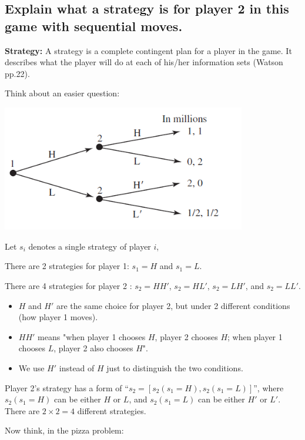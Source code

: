 \documentclass{article}
\begin{document}
%
%
\subsection{Explain what a strategy is for player 2 in this game with sequential moves.}
\label{subsec:stragey}

\begin{mdframed}[backgroundcolor=blue!20,linecolor=white]

\textbf{Strategy:} A strategy is a complete contingent plan for a player in the game.
It describes what the player will do at each of his/her information sets (Watson pp.22). 

\vspace{2mm}

Think about an easier question:

\begin{center}
{\includegraphics[width=0.8\textwidth]{7.f2_7}
\label{fig:f2_7}}
\vspace{2mm}
\end{center}

Let $s_i$ denotes a single strategy of player $i$,

There are 2 strategies for player 1: $s_1 =H$ and $s_1=L$. 

There are 4 strategies for player 2 : $s_2 =HH'$, $s_2 =HL'$, $s_2 =LH'$, and $s_2 =LL'$.

\begin{itemize}
\item $H$ and $H'$ are the same choice for player 2, but under 2 different conditions (how player 1 moves).
\item $HH'$ means "when player 1 chooses $H$, player 2 chooses $H$; when player 1 chooses $L$, player 2 also chooses $H$". 
\item We use $H'$ instead of $H$ just to distinguish the two conditions.
\end{itemize}

Player 2's strategy has a form of ``$s_2 = [s_2(s_1 = H),s_2(s_1 = L)]$'', where $s_2(s_1 = H)$ can be either $H$ or $L$, and $s_2(s_1 = L)$ can be either $H'$ or $L'$. There are $2 \times 2 = 4$ different strategies.

\vspace{3mm}

Now think, in the pizza problem:

\end{mdframed}
\end{document}
